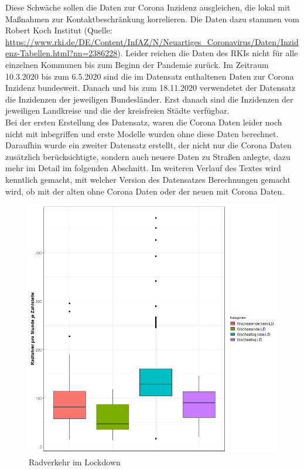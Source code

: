 \documentclass[a4paper,12pt]{thesis}
\begin{document}
Diese Schwäche sollen die Daten zur Corona Inzidenz ausgleichen, die lokal mit Maßnahmen zur Kontaktbeschränkung korrelieren. Die Daten dazu stammen vom Robert Koch Institut (Quelle: \url{https://www.rki.de/DE/Content/InfAZ/N/Neuartiges_Coronavirus/Daten/Inzidenz-Tabellen.html?nn=2386228}). Leider reichen die Daten des RKIs nicht für alle einzelnen Kommunen bis zum Beginn der Pandemie zurück. Im Zeitraum 10.3.2020 bis zum 6.5.2020 sind die im Datensatz enthaltenen Daten zur Corona Inzidenz bundesweit. Danach und bis zum 18.11.2020 verwendetet der Datensatz die Inzidenzen der jeweiligen Bundesländer. Erst danach sind die Inzidenzen der jeweiligen Landkreise und die der kreisfreien Städte verfügbar.\\
Bei der ersten Erstellung des Datensatz, waren die Corona Daten leider noch nicht mit inbegriffen und erste Modelle wurden ohne diese Daten berechnet. Daraufhin wurde ein zweiter Datensatz erstellt, der nicht nur die Corona Daten zusätzlich berücksichtigte, sondern auch neuere Daten zu Straßen anlegte, dazu mehr im Detail im folgenden Abschnitt. Im weiteren Verlauf des Textes wird kenntlich gemacht, mit welcher Version des Datensatzes Berechnungen gemacht wird, ob mit der alten ohne Corona Daten oder der neuen mit Corona Daten.\\

\begin{figure}[!ht]
	\centering
	\includegraphics[width=\textwidth]{Plots/plot63.png}
	\caption{Radverkehr im Lockdown}
	\label{CoronaandBiking}
\end{figure}
\end{document}
